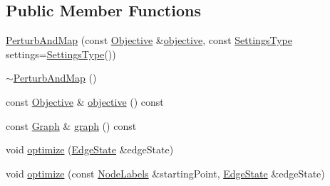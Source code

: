 \subsection*{Public Member Functions}
\begin{DoxyCompactItemize}
\item 
\hyperlink{classnifty_1_1graph_1_1optimization_1_1multicut_1_1PerturbAndMap_af77e360449ea24d7db93fe455e90f0d8}{Perturb\+And\+Map} (const \hyperlink{classnifty_1_1graph_1_1optimization_1_1multicut_1_1PerturbAndMap_a2048cdfa7924f3638cbf678021514bdd}{Objective} \&\hyperlink{classnifty_1_1graph_1_1optimization_1_1multicut_1_1PerturbAndMap_aefc4823a4564e9318610eb99f44bdc36}{objective}, const \hyperlink{structnifty_1_1graph_1_1optimization_1_1multicut_1_1PerturbAndMap_1_1SettingsType}{Settings\+Type} settings=\hyperlink{structnifty_1_1graph_1_1optimization_1_1multicut_1_1PerturbAndMap_1_1SettingsType}{Settings\+Type}())
\item 
\hyperlink{classnifty_1_1graph_1_1optimization_1_1multicut_1_1PerturbAndMap_aa29860cf9adb51ff66228307ae0f9e26}{$\sim$\+Perturb\+And\+Map} ()
\item 
const \hyperlink{classnifty_1_1graph_1_1optimization_1_1multicut_1_1PerturbAndMap_a2048cdfa7924f3638cbf678021514bdd}{Objective} \& \hyperlink{classnifty_1_1graph_1_1optimization_1_1multicut_1_1PerturbAndMap_aefc4823a4564e9318610eb99f44bdc36}{objective} () const 
\item 
const \hyperlink{classnifty_1_1graph_1_1optimization_1_1multicut_1_1PerturbAndMap_a97e092acc69aeaa88390baf080709c1e}{Graph} \& \hyperlink{classnifty_1_1graph_1_1optimization_1_1multicut_1_1PerturbAndMap_a5523b26b3ed90c445ccd86fa94994ba8}{graph} () const 
\item 
void \hyperlink{classnifty_1_1graph_1_1optimization_1_1multicut_1_1PerturbAndMap_aec44f0ae8d966b94b6fa11faee1ca6b6}{optimize} (\hyperlink{classnifty_1_1graph_1_1optimization_1_1multicut_1_1PerturbAndMap_a3ae495ccf80fcc76720dcd7c762eb678}{Edge\+State} \&edge\+State)
\item 
void \hyperlink{classnifty_1_1graph_1_1optimization_1_1multicut_1_1PerturbAndMap_a4bcc0199fbeee6e26f4ccf4fb2e458a4}{optimize} (const \hyperlink{classnifty_1_1graph_1_1optimization_1_1multicut_1_1PerturbAndMap_a693ef4c90566732057ce860c6215d100}{Node\+Labels} \&starting\+Point, \hyperlink{classnifty_1_1graph_1_1optimization_1_1multicut_1_1PerturbAndMap_a3ae495ccf80fcc76720dcd7c762eb678}{Edge\+State} \&edge\+State)
\end{DoxyCompactItemize}


